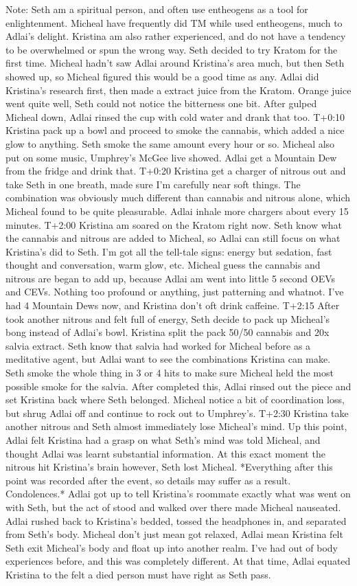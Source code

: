 \documentclass[12pt]{book}
\begin{document}
Note: Seth am a spiritual person, and often use entheogens as a tool for enlightenment. Micheal have frequently did TM while used entheogens, much to Adlai's delight. Kristina am also rather experienced, and do not have a tendency to be overwhelmed or spun the wrong way. Seth decided to try Kratom for the first time. Micheal hadn't saw Adlai around Kristina's area much, but then Seth showed up, so Micheal figured this would be a good time as any. Adlai did Kristina's research first, then made a extract juice from the Kratom. Orange juice went quite well, Seth could not notice the bitterness one bit. After gulped Micheal down, Adlai rinsed the cup with cold water and drank that too. T+0:10 Kristina pack up a bowl and proceed to smoke the cannabis, which added a nice glow to anything. Seth smoke the same amount every hour or so. Micheal also put on some music, Umphrey's McGee live showed. Adlai get a Mountain Dew from the fridge and drink that. T+0:20 Kristina get a charger of nitrous out and take Seth in one breath, made sure I'm carefully near soft things. The combination was obviously much different than cannabis and nitrous alone, which Micheal found to be quite pleasurable. Adlai inhale more chargers about every 15 minutes. T+2:00 Kristina am soared on the Kratom right now. Seth know what the cannabis and nitrous are added to Micheal, so Adlai can still focus on what Kristina's did to Seth. I'm got all the tell-tale signs: energy but sedation, fast thought and conversation, warm glow, etc. Micheal guess the cannabis and nitrous are began to add up, because Adlai am went into little 5 second OEVs and CEVs. Nothing too profound or anything, just patterning and whatnot. I've had 4 Mountain Dews now, and Kristina don't oft drink caffeine. T+2:15 After took another nitrous and felt full of energy, Seth decide to pack up Micheal's bong instead of Adlai's bowl. Kristina split the pack 50/50 cannabis and 20x salvia extract. Seth know that salvia had worked for Micheal before as a meditative agent, but Adlai want to see the combinations Kristina can make. Seth smoke the whole thing in 3 or 4 hits to make sure Micheal held the most possible smoke for the salvia. After completed this, Adlai rinsed out the piece and set Kristina back where Seth belonged. Micheal notice a bit of coordination loss, but shrug Adlai off and continue to rock out to Umphrey's. T+2:30 Kristina take another nitrous and Seth almost immediately lose Micheal's mind. Up this point, Adlai felt Kristina had a grasp on what Seth's mind was told Micheal, and thought Adlai was learnt substantial information. At this exact moment the nitrous hit Kristina's brain however, Seth lost Micheal. *Everything after this point was recorded after the event, so details may suffer as a result. Condolences.* Adlai got up to tell Kristina's roommate exactly what was went on with Seth, but the act of stood and walked over there made Micheal nauseated. Adlai rushed back to Kristina's bedded, tossed the headphones in, and separated from Seth's body. Micheal don't just mean got relaxed, Adlai mean Kristina felt Seth exit Micheal's body and float up into another realm. I've had out of body experiences before, and this was completely different. At that time, Adlai equated Kristina to the felt a died person must have right as Seth pass. 
\end{document}
